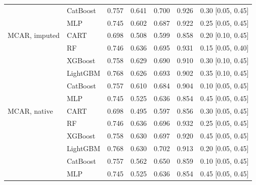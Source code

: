 \documentclass[pdflatex,sn-mathphys]{sn-jnl}
\theoremstyle{thmstyleone}
\begin{document}
\begin{table}[htbp]
\begin{tabular}{@{}llrrrrl@{}}
 & CatBoost & 0.757 & 0.641 & 0.700 & 0.926 & 0.30 [0.05, 0.45] \\
 & MLP & 0.745 & 0.602 & 0.687 & 0.922 & 0.25 [0.05, 0.45] \\
\midrule
MCAR, imputed & CART & 0.698 & 0.508 & 0.599 & 0.858 & 0.20 [0.10, 0.45] \\
 & RF & 0.746 & 0.636 & 0.695 & 0.931 & 0.15 [0.05, 0.40] \\
 & XGBoost & 0.758 & 0.629 & 0.690 & 0.910 & 0.30 [0.10, 0.45] \\
 & LightGBM & 0.768 & 0.626 & 0.693 & 0.902 & 0.35 [0.10, 0.45] \\
 & CatBoost & 0.757 & 0.610 & 0.684 & 0.904 & 0.10 [0.05, 0.45] \\
 & MLP & 0.745 & 0.525 & 0.636 & 0.854 & 0.45 [0.05, 0.45] \\
\midrule
MCAR, native & CART & 0.698 & 0.495 & 0.597 & 0.856 & 0.30 [0.05, 0.45] \\
 & RF & 0.746 & 0.636 & 0.696 & 0.932 & 0.25 [0.05, 0.45] \\
 & XGBoost & 0.758 & 0.630 & 0.697 & 0.920 & 0.45 [0.05, 0.45] \\
 & LightGBM & 0.768 & 0.630 & 0.702 & 0.913 & 0.20 [0.05, 0.45] \\
 & CatBoost & 0.757 & 0.562 & 0.650 & 0.859 & 0.10 [0.05, 0.45] \\
 & MLP & 0.745 & 0.525 & 0.636 & 0.854 & 0.45 [0.05, 0.45] \\
\bottomrule
\end{tabular}
\end{table}
\end{document}
